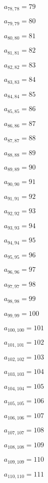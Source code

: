 \documentclass[a4paper,12pt]{article}
\begin{document}
$a _{ 78, 78 } = 79$

$a _{ 79, 79 } = 80$

$a _{ 80, 80 } = 81$

$a _{ 81, 81 } = 82$

$a _{ 82, 82 } = 83$

$a _{ 83, 83 } = 84$

$a _{ 84, 84 } = 85$

$a _{ 85, 85 } = 86$

$a _{ 86, 86 } = 87$

$a _{ 87, 87 } = 88$

$a _{ 88, 88 } = 89$

$a _{ 89, 89 } = 90$

$a _{ 90, 90 } = 91$

$a _{ 91, 91 } = 92$

$a _{ 92, 92 } = 93$

$a _{ 93, 93 } = 94$

$a _{ 94, 94 } = 95$

$a _{ 95, 95 } = 96$

$a _{ 96, 96 } = 97$

$a _{ 97, 97 } = 98$

$a _{ 98, 98 } = 99$

$a _{ 99, 99 } = 100$

$a _{ 100, 100 } = 101$

$a _{ 101, 101 } = 102$

$a _{ 102, 102 } = 103$

$a _{ 103, 103 } = 104$

$a _{ 104, 104 } = 105$

$a _{ 105, 105 } = 106$

$a _{ 106, 106 } = 107$

$a _{ 107, 107 } = 108$

$a _{ 108, 108 } = 109$

$a _{ 109, 109 } = 110$

$a _{ 110, 110 } = 111$
\end{document}
